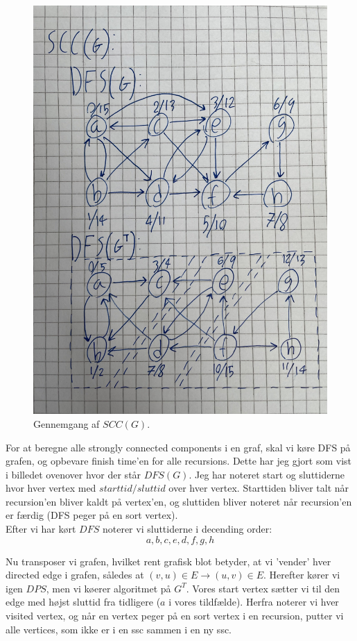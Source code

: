 \documentclass[a4paper,12pt]{article}
\begin{document}
\begin{figure}[H]
    \centering
    \includegraphics[width=1\textwidth]{SCC.jpg}
    \caption{Gennemgang af $SCC(G)$.}
\end{figure}

For at beregne alle strongly connected components i en graf, skal vi køre DFS på grafen, og opbevare finish time'en for alle recursions. Dette har jeg gjort som vist i billedet ovenover hvor der står $DFS(G)$. Jeg har noteret start og sluttiderne hvor hver vertex med $starttid/sluttid$ over hver vertex. Starttiden bliver talt når recursion'en bliver kaldt på vertex'en, og sluttiden bliver noteret når recursion'en er færdig (DFS peger på en sort vertex).\\

Efter vi har kørt $DFS$ noterer vi sluttiderne i decending order:
\[a,b,c,e,d,f,g,h\]

Nu transposer vi grafen, hvilket rent grafisk blot betyder, at vi 'vender' hver directed edge i grafen, således at $(v,u)\in E \rightarrow (u,v)\in E$. Herefter kører vi igen $DPS$, men vi køerer algoritmet på $G^T$. Vores start vertex sætter vi til den edge med højst sluttid fra tidligere ($a$ i vores tildfælde). Herfra noterer vi hver visited vertex, og når en vertex peger på en sort vertex i en recursion, putter vi alle vertices, som ikke er i en ssc sammen i en ny ssc.\\
\end{document}
